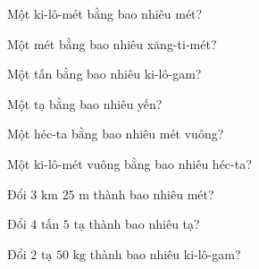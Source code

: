 
\begin{ex}
  Một ki-lô-mét bằng bao nhiêu mét?
\end{ex}

\begin{ex}
  Một mét bằng bao nhiêu xăng-ti-mét?
\end{ex}

\begin{ex}
  Một tấn bằng bao nhiêu ki-lô-gam?
\end{ex}

\begin{ex}
  Một tạ bằng bao nhiêu yến?
\end{ex}

\begin{ex}
  Một héc-ta bằng bao nhiêu mét vuông?
\end{ex}

\begin{ex}
  Một ki-lô-mét vuông bằng bao nhiêu héc-ta?
\end{ex}

\begin{ex}
  Đổi $3\text{ km } 25\text{ m}$ thành bao nhiêu mét?
\end{ex}

\begin{ex}
  Đổi $4\text{ tấn } 5\text{ tạ}$ thành bao nhiêu tạ?
\end{ex}

\begin{ex}
  Đổi $2\text{ tạ } 50\text{ kg}$ thành bao nhiêu ki-lô-gam?
\end{ex}

